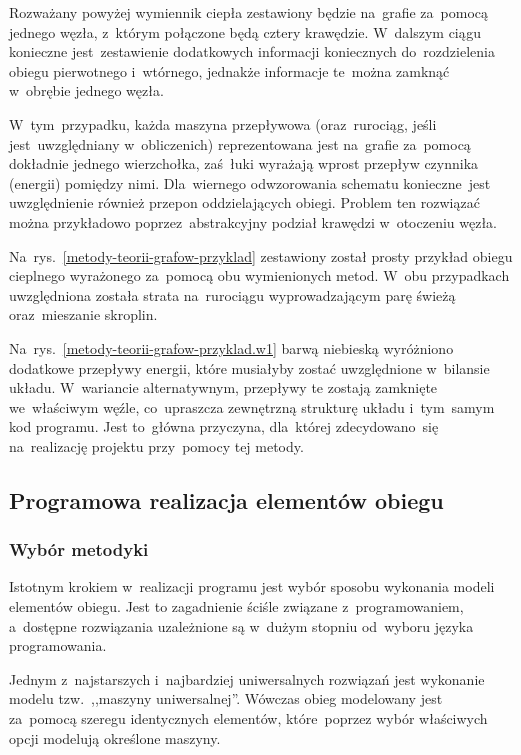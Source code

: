 Rozważany powyżej wymiennik ciepła zestawiony będzie na~grafie za~pomocą
jednego węzła, z~którym połączone będą cztery krawędzie. W~dalszym ciągu
konieczne jest~zestawienie dodatkowych informacji koniecznych
do~rozdzielenia obiegu pierwotnego i~wtórnego, jednakże informacje
te~można zamknąć w~obrębie jednego węzła.

W~tym~przypadku, każda maszyna przepływowa (oraz~rurociąg, jeśli
jest~uwzględniany w~obliczenich) reprezentowana jest na~grafie za~pomocą
dokładnie jednego wierzchołka, zaś~łuki wyrażają wprost przepływ
czynnika (energii) pomiędzy nimi. Dla~wiernego odwzorowania schematu
konieczne~jest uwzględnienie również przepon oddzielających obiegi.
Problem ten rozwiązać można przykładowo poprzez~abstrakcyjny podział
krawędzi w~otoczeniu węzła.

Na~rys.~\ref{metody-teorii-grafow-przyklad} zestawiony został prosty
przykład obiegu cieplnego wyrażonego za~pomocą obu wymienionych metod.
W~obu przypadkach uwzględniona została strata na~rurociągu
wyprowadzającym parę świeżą oraz~mieszanie skroplin.

Na~rys.~\ref{metody-teorii-grafow-przyklad.w1} barwą niebieską
wyróżniono dodatkowe przepływy energii, które musiałyby zostać
uwzględnione w~bilansie układu. W~wariancie alternatywnym, przepływy te
zostają zamknięte we~właściwym węźle, co~upraszcza zewnętrzną strukturę
układu i~tym~samym kod programu. Jest to~główna przyczyna, dla~której
zdecydowano~się na~realizację projektu przy~pomocy tej metody.


\subsection{Programowa realizacja elementów obiegu}

\subsubsection{Wybór metodyki}

Istotnym krokiem w~realizacji programu jest wybór sposobu wykonania
modeli elementów obiegu. Jest to zagadnienie ściśle związane
z~programowaniem, a~dostępne rozwiązania uzależnione są w~dużym stopniu
od~wyboru języka programowania.

Jednym z~najstarszych i~najbardziej uniwersalnych rozwiązań jest
wykonanie modelu tzw.~,,maszyny uniwersalnej''. Wówczas obieg modelowany
jest za~pomocą szeregu identycznych elementów, które~poprzez wybór
właściwych opcji modelują określone maszyny.

